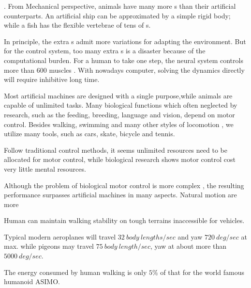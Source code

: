 \begin{itemize}
.
From Mechanical perspective, animals have many more {\dof}s than their artificial counterparts.
An artificial ship can be approximated by a simple rigid body; while a fish has the flexible vertebrae of tens of {\dof}s.


In principle, the extra {\dof}s admit more variations for adapting the environment. 
But for the control system, too many extra {\dof}s is a disaster because of the computational burden. 
For a human to take one step,  the neural system controls more than $600$ muscles .
With nowadays computer, solving the dynamics directly will require inhibitive long time.

 
Most artificial machines are designed with a single purpose,while animals are capable  of unlimited tasks.
Many biological functions which often neglected by \cms research, such as the feeding, breeding, language and vision, depend on motor control. 
Besides walking, swimming and many other styles of locomotion , we utilize many tools, such as cars, skate, bicycle and tennis.

Follow traditional control methods, it seems unlimited resources need to be  allocated for motor control, while biological research shows motor control cost very little mental resources.

Although the problem of biological motor control is more complex , the resulting performance surpasses artificial machines in many aspects.
Natural motion are more
\begin{enumerate} 

Human can maintain walking stability on tough terrains inaccessible for vehicles.

Typical modern aeroplanes will travel $32\: body\: lengths/sec$ and yaw $720\: deg/sec$ at max.
while pigeons may travel $75 \:body\: length / sec$, yaw at about more than $5000 \: deg/sec$.

The energy consumed by human walking is only $5\%$ of that for the world famous humanoid ASIMO.
\end{enumerate}

\end{itemize}



